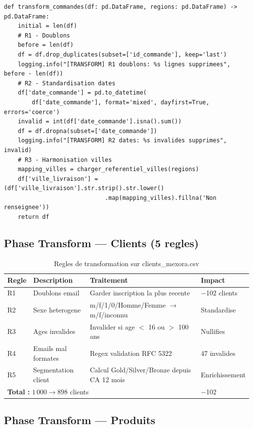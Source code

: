 \documentclass[12pt,a4paper]{article}
\begin{document}
\begin{lstlisting}[style=python, caption=Extrait transform\_commandes -- R1 et R2]
def transform_commandes(df: pd.DataFrame, regions: pd.DataFrame) -> pd.DataFrame:
    initial = len(df)
    # R1 - Doublons
    before = len(df)
    df = df.drop_duplicates(subset=['id_commande'], keep='last')
    logging.info("[TRANSFORM] R1 doublons: %s lignes supprimees", before - len(df))
    # R2 - Standardisation dates
    df['date_commande'] = pd.to_datetime(
        df['date_commande'], format='mixed', dayfirst=True, errors='coerce')
    invalid = int(df['date_commande'].isna().sum())
    df = df.dropna(subset=['date_commande'])
    logging.info("[TRANSFORM] R2 dates: %s invalides supprimes", invalid)
    # R3 - Harmonisation villes
    mapping_villes = charger_referentiel_villes(regions)
    df['ville_livraison'] = (df['ville_livraison'].str.strip().str.lower()
                             .map(mapping_villes).fillna('Non renseignee'))
    return df
\end{lstlisting}

\subsection{Phase Transform --- Clients (5 regles)}

\begin{table}[H]
\centering
\begin{tabular}{p{0.8cm} p{3.5cm} p{6cm} p{2.5cm}}
\toprule
\textbf{Regle} & \textbf{Description} & \textbf{Traitement} & \textbf{Impact}\\
\midrule
R1 & Doublons email & Garder inscription la plus recente & $-$102 clients\\
R2 & Sexe heterogene & m/f/1/0/Homme/Femme $\to$ m/f/inconnu & Standardise\\
R3 & Ages invalides & Invalider si age $<$ 16 ou $>$ 100 ans & Nullifies\\
R4 & Emails mal formates & Regex validation RFC 5322 & 47 invalides\\
R5 & Segmentation client & Calcul Gold/Silver/Bronze depuis CA 12 mois & Enrichissement\\
\midrule
\multicolumn{3}{l}{\textbf{Total :} $1\,000 \to 898$ clients} & $-$102\\
\bottomrule
\end{tabular}
\caption{Regles de transformation sur clients\_mexora.csv}
\end{table}

\subsection{Phase Transform --- Produits}
\end{document}
